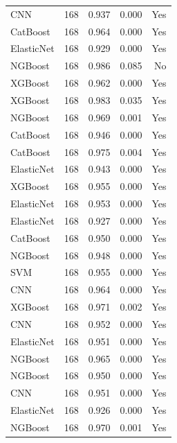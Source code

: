 \begin{table}
\begin{tabular}{lrrrr}
       CNN & 168 &        0.937 &     0.000 &                Yes \\
  CatBoost & 168 &        0.964 &     0.000 &                Yes \\
ElasticNet & 168 &        0.929 &     0.000 &                Yes \\
   NGBoost & 168 &        0.986 &     0.085 &                 No \\
   XGBoost & 168 &        0.962 &     0.000 &                Yes \\
   XGBoost & 168 &        0.983 &     0.035 &                Yes \\
   NGBoost & 168 &        0.969 &     0.001 &                Yes \\
  CatBoost & 168 &        0.946 &     0.000 &                Yes \\
  CatBoost & 168 &        0.975 &     0.004 &                Yes \\
ElasticNet & 168 &        0.943 &     0.000 &                Yes \\
   XGBoost & 168 &        0.955 &     0.000 &                Yes \\
ElasticNet & 168 &        0.953 &     0.000 &                Yes \\
ElasticNet & 168 &        0.927 &     0.000 &                Yes \\
  CatBoost & 168 &        0.950 &     0.000 &                Yes \\
   NGBoost & 168 &        0.948 &     0.000 &                Yes \\
       SVM & 168 &        0.955 &     0.000 &                Yes \\
       CNN & 168 &        0.964 &     0.000 &                Yes \\
   XGBoost & 168 &        0.971 &     0.002 &                Yes \\
       CNN & 168 &        0.952 &     0.000 &                Yes \\
ElasticNet & 168 &        0.951 &     0.000 &                Yes \\
   NGBoost & 168 &        0.965 &     0.000 &                Yes \\
   NGBoost & 168 &        0.950 &     0.000 &                Yes \\
       CNN & 168 &        0.951 &     0.000 &                Yes \\
ElasticNet & 168 &        0.926 &     0.000 &                Yes \\
   NGBoost & 168 &        0.970 &     0.001 &                Yes \\

\end{tabular}
\end{table}
